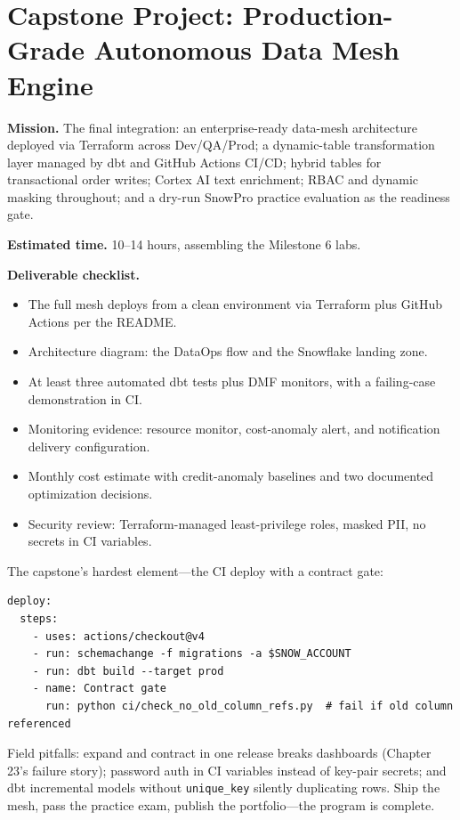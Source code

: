 \section{Capstone Project: Production-Grade Autonomous Data Mesh Engine}\label{sec:ch24-capstone}
\begin{capstonebox}
\textbf{Mission.} The final integration: an enterprise-ready data-mesh architecture deployed via Terraform across Dev/QA/Prod; a dynamic-table transformation layer managed by dbt and GitHub Actions CI/CD; hybrid tables for transactional order writes; Cortex AI text enrichment; RBAC and dynamic masking throughout; and a dry-run SnowPro practice evaluation as the readiness gate.

\textbf{Estimated time.} 10--14 hours, assembling the Milestone 6 labs.

\textbf{Deliverable checklist.}
\begin{itemize}
    \item The full mesh deploys from a clean environment via Terraform plus GitHub Actions per the README.
    \item Architecture diagram: the DataOps flow and the Snowflake landing zone.
    \item At least three automated dbt tests plus DMF monitors, with a failing-case demonstration in CI.
    \item Monitoring evidence: resource monitor, cost-anomaly alert, and notification delivery configuration.
    \item Monthly cost estimate with credit-anomaly baselines and two documented optimization decisions.
    \item Security review: Terraform-managed least-privilege roles, masked PII, no secrets in CI variables.
\end{itemize}
\end{capstonebox}

The capstone's hardest element---the CI deploy with a contract gate:

\begin{lstlisting}[caption={GitHub Actions deploy job (pseudocode)}]
deploy:
  steps:
    - uses: actions/checkout@v4
    - run: schemachange -f migrations -a $SNOW_ACCOUNT
    - run: dbt build --target prod
    - name: Contract gate
      run: python ci/check_no_old_column_refs.py  # fail if old column referenced
\end{lstlisting}

Field pitfalls: expand and contract in one release breaks dashboards (Chapter 23's failure story); password auth in CI variables instead of key-pair secrets; and dbt incremental models without \texttt{unique\_key} silently duplicating rows. Ship the mesh, pass the practice exam, publish the portfolio---the program is complete.
